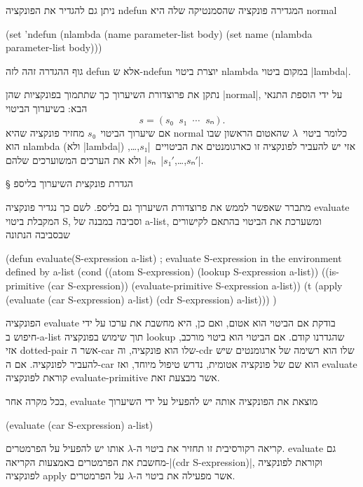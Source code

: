 \documentclass[a4paper,12pt,reqno]{article}
\begin{document}
ניתן גם להגדיר את הפונקציה ndefun המגדירה פונקציה שהסמנטיקה שלה היא normal
\begin{LISP}
(set 'ndefun
  (nlambda (name parameter-list body)  
      (set name (nlambda parameter-list body)))
\end{LISP}
גוף ההגדרה זהה לזה defun אלא ש-ndefun יוצרת ביטוי nlambda במקום ביטוי
\E|lambda|.

נתקן את פרוצדורת השיערוך כך שתתמוך בפונקציות שהן \E|normal|, על ידי הוספת התנאי
הבא: בשיערוך הביטוי \[
  s=(s₀\;\;s₁\;\;⋯\;\;sₙ).
\] אם שיערוך הביטוי~$s₀$ מחזיר פונקציה שהיא
normal כלומר ביטוי~$λ$ שהאטום הראשון שבו הוא nlambda (ולא \E|lambda|) אזי יש
להעביר לפונקציה זו כארגומנטים את הביטויים~\E|$s₁$,…,$sₙ$| ולא את הערכים
המשוערכים שלהם~\E|$s₁'$,…,$sₙ'$|.

§ הגדרת פונקצית השיערוך בליספ

מתברר שאפשר לממש את פרוצדורת השיערוך גם בליספ.
לשם כך נגדיר פונקציה evaluate
המקבלת ביטוי S, וסביבה במבנה של a-list, ומשערכת
את הביטוי בהתאם לקישורים שבסביבה הנתונה
\begin{LISP}
(defun evaluate(S-expression a-list)
; evaluate S-expression in the environment defined by a-list
  (cond
    ((atom S-expression)
      (lookup S-expression a-list))
    ((is-primitive (car S-expression))
      (evaluate-primitive S-expression a-list))
    (t
      (apply
        (evaluate (car S-expression) a-list)
        (cdr S-expression)
        a-list)))
)
\end{LISP}
הפונקציה evaluate בודקת אם הביטוי הוא אטום, ואם כן, היא מחשבת את ערכו על ידי
חיפוש ב-a-list תוך שימוש בפונקציה lookup שהגדרנו קודם. אם הביטוי הוא ביטוי
מורכב, אזי dotted-pair אשר ה-car שלו הוא פונקציה, וה-cdr שלו הוא רשימה של
ארגומנטים שיש להעביר לפונקציה. אם ה-car הוא שם של פונקציה אטומית, נדרש טיפול
מיוחד, ואז evaluate קוראת לפונקציה evaluate-primitive אשר מבצעת זאת.

בכל מקרה אחר, evaluate מוצאת את הפונקציה אותה יש להפעיל על ידי השיערוך
\begin{LISP}
(evaluate (car S-expression) a-list)
\end{LISP}
קריאה רקורסיבית זו תחזיר את ביטוי ה-$λ$ אותו יש להפעיל על הפרמטרים. evaluate
גם מחשבת את הפרמטרים באמצעות הקריאה-\T|(cdr S-expression)|, וקוראת לפונקציה
לפונקציה apply אשר מפעילה את ביטוי ה-$λ$ על הפרמטרים.
\end{document}
